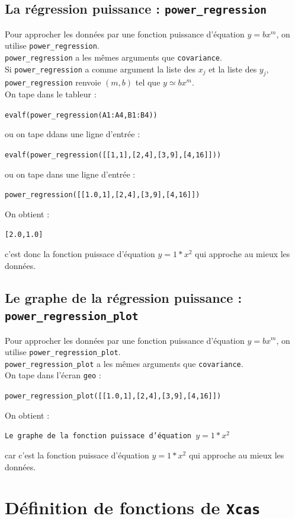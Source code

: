 \documentclass[a4paper,11pt]{book}
\begin{document}
\subsection{La r\'egression puissance : {\tt power\_regression}}
Pour approcher les donn\'ees par  une fonction puissance d'\'equation
$y=bx^m$, on utilise  {\tt power\_regression}.\\
{\tt power\_regression} a les m\^emes arguments que {\tt covariance}.\\
Si {\tt power\_regression} a comme argument la liste des $x_j$ et la liste
 des $y_j$, {\tt power\_regression} renvoie $(m, b)$ tel que $y \simeq bx^m$.\\
On tape dans le tableur :
\begin{center}{\tt evalf(power\_regression(A1:A4,B1:B4))}\end{center}
ou on tape ddans une ligne d'entr\'ee :
\begin{center}{\tt evalf(power\_regression([[1,1],[2,4],[3,9],[4,16]]))}\end{center}
ou on tape dans une ligne d'entr\'ee :
\begin{center}{\tt power\_regression([[1.0,1],[2,4],[3,9],[4,16]])}\end{center}
On obtient :
\begin{center}{\tt  [2.0,1.0]}\end{center}
c'est donc la fonction puissace d'\'equation $y=1*x^2$ qui approche au mieux 
les donn\'ees.
\subsection{Le graphe de la r\'egression puissance : {\tt power\_regression\_plot}}
Pour approcher les donn\'ees par  une fonction puissance d'\'equation
$y=bx^m$, on utilise  {\tt power\_regression\_plot}.\\
{\tt power\_regression\_plot} a les m\^emes arguments que {\tt covariance}.\\
On tape dans l'\'ecran {\tt geo} :
\begin{center}{\tt power\_regression\_plot([[1.0,1],[2,4],[3,9],[4,16]])}\end{center}
On obtient :
\begin{center}{\tt Le graphe de la fonction puissace d'\'equation $y=1*x^2$}\end{center}
car c'est la fonction puissace d'\'equation $y=1*x^2$ qui approche au mieux 
les donn\'ees.
\section{D\'efinition de fonctions de {\tt Xcas}}
\end{document}
